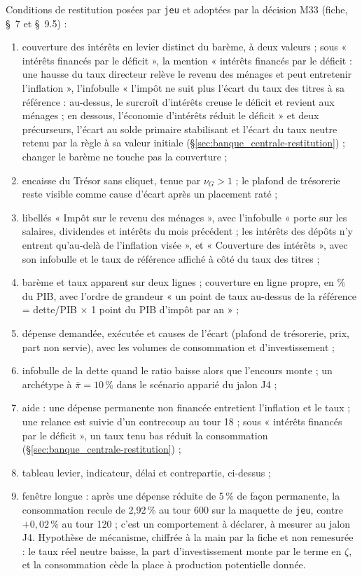 \documentclass[11pt,a4paper]{article}
\begin{document}
\begin{joueur}
Conditions de restitution posées par \texttt{jeu} et adoptées par la décision M33 (fiche, \S~7 et \S~9.5) :
\begin{enumerate}
\item couverture des intérêts en levier distinct du barème, à deux valeurs ; sous « intérêts financés par le déficit », la mention « intérêts financés par le déficit : une hausse du taux directeur relève le revenu des ménages et peut entretenir l'inflation », l'infobulle « l'impôt ne suit plus l'écart du taux des titres à sa référence : au-dessus, le surcroît d'intérêts creuse le déficit et revient aux ménages ; en dessous, l'économie d'intérêts réduit le déficit » et deux précurseurs, l'écart au solde primaire stabilisant et l'écart du taux neutre retenu par la règle à sa valeur initiale (\S\ref{sec:banque_centrale-restitution}) ; changer le barème ne touche pas la couverture ;
\item encaisse du Trésor sans cliquet, tenue par $\nu_G > 1$ ; le plafond de trésorerie reste visible comme cause d'écart après un placement raté ;
\item libellés « Impôt sur le revenu des ménages », avec l'infobulle « porte sur les salaires, dividendes et intérêts du mois précédent ; les intérêts des dépôts n'y entrent qu'au-delà de l'inflation visée », et « Couverture des intérêts », avec son infobulle et le taux de référence affiché à côté du taux des titres ;
\item barème et taux apparent sur deux lignes ; couverture en ligne propre, en \% du PIB, avec l'ordre de grandeur « un point de taux au-dessus de la référence = dette/PIB × 1 point du PIB d'impôt par an » ;
\item dépense demandée, exécutée et causes de l'écart (plafond de trésorerie, prix, part non servie), avec les volumes de consommation et d'investissement ;
\item infobulle de la dette quand le ratio baisse alors que l'encours monte ; un archétype à $\bar\pi = 10\,\%$ dans le scénario apparié du jalon J4 ;
\item aide : une dépense permanente non financée entretient l'inflation et le taux ; une relance est suivie d'un contrecoup au tour 18 ; sous « intérêts financés par le déficit », un taux tenu bas réduit la consommation (\S\ref{sec:banque_centrale-restitution}) ;
\item tableau levier, indicateur, délai et contrepartie, ci-dessus ;
\item fenêtre longue : après une dépense réduite de 5\,\% de façon permanente, la consommation recule de 2,92\,\% au tour 600 sur la maquette de \texttt{jeu}, contre $+0{,}02\,\%$ au tour 120 ; c'est un comportement à déclarer, à mesurer au jalon J4. Hypothèse de mécanisme, chiffrée à la main par la fiche et non remesurée : le taux réel neutre baisse, la part d'investissement monte par le terme en $\zeta$, et la consommation cède la place à production potentielle donnée.
\end{enumerate}
\end{joueur}
\end{document}
